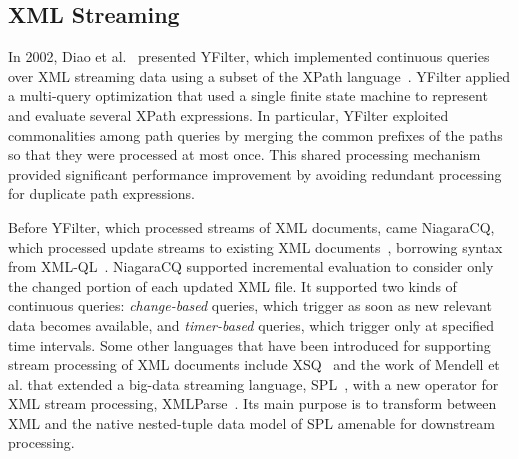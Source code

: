 \subsection{XML Streaming}\label{sec:xml} %

In 2002, Diao et al.~\cite{diao_et_al_2002,diao2003high} presented
\textsf{YFilter}, which implemented continuous queries over XML
streaming data using a subset of the XPath
language~\cite{clark_derose_1999}. YFilter applied a multi-query
optimization that used a single finite state machine to represent and
evaluate several XPath expressions. In particular, YFilter exploited
commonalities among path queries by merging the common prefixes of
the paths so that they were processed at most once. This shared
processing mechanism provided significant performance improvement by
avoiding redundant processing for duplicate path expressions.  \iffalse To
handle value-based predicates that address contents of elements,
YFilter applied two alternative approa\-ches. The first approach
evaluates the predicates once the addressed elements are read from a
document, while the second approach postpones predicate evaluation
until the corresponding path expression has been entirely matched.\fi

Before YFilter, which processed streams of XML documents, came
\textsf{NiagaraCQ}, which processed update streams to existing XML
documents~\cite{chen_et_al_2000}, borrowing syntax from
XML-QL~\cite{deutsch1999query}.  NiagaraCQ supported incremental
evaluation to consider only the changed portion of each updated XML
file. It supported two kinds of continuous queries:
\emph{change-based} queries, which trigger as soon as new relevant
data becomes available, and \emph{timer-based} queries, which trigger
only at specified time intervals. Some other languages that have been introduced for supporting stream processing of XML
documents include \textsf{XSQ}~\cite{peng_chawathe_2003} and the work of Mendell et al. that extended a big-data
streaming language, SPL~\cite{hirzel_schneider_gedik_2017}, with a new
operator for XML stream processing,
\textsf{XMLParse}~\cite{mendell_et_al_2012}. Its main purpose is to
transform between XML and the native nested-tuple data model of SPL
amenable for downstream processing.
